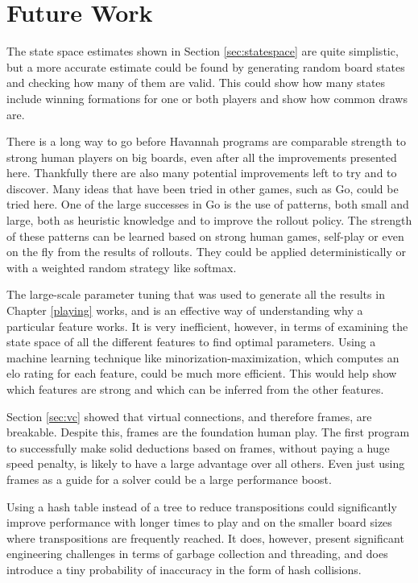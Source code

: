 \section{Future Work}

The state space estimates shown in Section \ref{sec:statespace} are quite simplistic, but a more accurate estimate could be found by generating random board states and checking how many of them are valid. This could show how many states include winning formations for one or both players and show how common draws are.

There is a long way to go before Havannah programs are comparable strength to strong human players on big boards, even after all the improvements presented here. Thankfully there are also many potential improvements left to try and to discover. Many ideas that have been tried in other games, such as Go, could be tried here. One of the large successes in Go is the use of patterns, both small and large, both as heuristic knowledge and to improve the rollout policy. The strength of these patterns can be learned based on strong human games, self-play or even on the fly from the results of rollouts. They could be applied deterministically or with a weighted random strategy like softmax.

The large-scale parameter tuning that was used to generate all the results in Chapter \ref{playing} works, and is an effective way of understanding why a particular feature works. It is very inefficient, however, in terms of examining the state space of all the different features to find optimal parameters. Using a machine learning technique like minorization-maximization\cite{coulom2007computing}, which computes an elo rating for each feature, could be much more efficient. This would help show which features are strong and which can be inferred from the other features.

Section \ref{sec:vc} showed that virtual connections, and therefore frames, are breakable. Despite this, frames are the foundation human play. The first program to successfully make solid deductions based on frames, without paying a huge speed penalty, is likely to have a large advantage over all others. Even just using frames as a guide for a solver could be a large performance boost.

Using a hash table instead of a tree to reduce transpositions could significantly improve performance with longer times to play and on the smaller board sizes where transpositions are frequently reached. It does, however, present significant engineering challenges in terms of garbage collection and threading, and does introduce a tiny probability of inaccuracy in the form of hash collisions.

